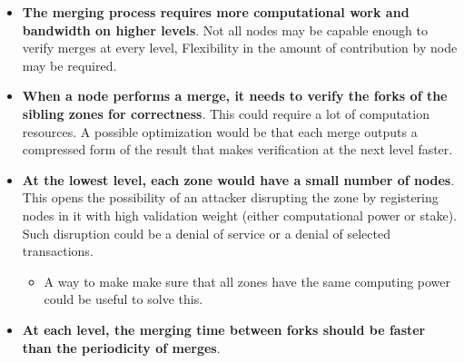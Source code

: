 \documentclass[portrait,a0paper,fontscale=0.285]{baposter} %
\begin{document}
\begin{poster}
{\begin{itemize}[leftmargin=1em]
    \item \textbf{The merging process requires more computational work and bandwidth on
        higher levels}.  Not all nodes may be capable enough to verify merges at
        every level,  Flexibility in the amount of contribution by node may be
        required.
    \item \textbf{When a node performs a merge, it needs to verify the forks of the
        sibling zones for correctness}.  This could require a lot of computation
        resources.  A possible optimization would be that each merge outputs a
        compressed form of the result that makes verification at the next level
        faster.
    \item \textbf{At the lowest level, each zone would have a small number of nodes}.
        This opens the possibility of an attacker disrupting the zone by
        registering nodes in it with high validation weight (either
        computational power or stake).  Such disruption could be a denial of
        service or a denial of selected transactions.
    \begin{itemize}[leftmargin=1em]
        \item A way to make make sure that all zones have the same computing
            power could be useful to solve this.
    \end{itemize}
    \item \textbf{At each level, the merging time between forks should be faster than the
        periodicity of merges}.
\end{itemize}

}



\end{poster}
\end{document}
